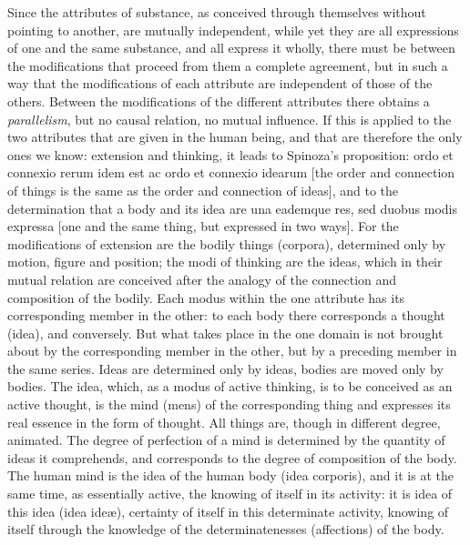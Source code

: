Since the attributes of substance, as conceived through themselves
without pointing to another, are mutually independent, while yet they
are all expressions of one and the same substance, and all express it
wholly, there must be between the modifications that proceed from them
a complete agreement, but in such a way that the modifications of each
attribute are independent of those of the others. Between the
modifications of the different attributes there obtains a
\emph{parallelism}, but no causal relation, no mutual influence. If
this is applied to the two attributes that are given in the human
being, and that are therefore the only ones we know: extension and
thinking, it leads to Spinoza's proposition: ordo et connexio rerum
idem est ac ordo et connexio idearum [the order and connection of
things is the same as the order and connection of ideas], and to the
determination that a body and its idea are una eademque res, sed
duobus modis expressa [one and the same thing, but expressed in two
ways]. For the modifications of extension are the bodily things
(corpora), determined only by motion, figure and position; the modi of
thinking are the ideas, which in their mutual relation are
conceived after the analogy of the connection and
composition of the bodily. Each modus within the one attribute has its
corresponding member in the other: to each body there corresponds a
thought (idea), and conversely. But what takes place in the one domain
is not brought about by the corresponding member in the other, but by
a preceding member in the same series. Ideas are determined only by
ideas, bodies are moved only by bodies. The idea, which, as a modus of
active thinking, is to be conceived as an active thought, is the mind
(mens) of the corresponding thing and expresses its real essence in
the form of thought. All things are, though in different degree,
animated. The degree of perfection of a mind is determined by the
quantity of ideas it comprehends, and corresponds to the degree of
composition of the body. The human mind is the idea of the human body
(idea corporis), and it is at the same time, as essentially active,
the knowing of itself in its activity: it is idea of this idea (idea
ideæ), certainty of itself in this determinate activity, knowing of
itself through the knowledge of the determinatenesses (affections) of
the body.

